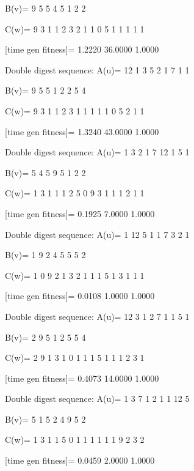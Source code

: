 B(v)=
     9     5     5     4     5     1     2     2

C(w)=
     9     3     1     1     2     3     2     1     1     0     5     1     1     1     1     1

[time gen fitness]=
    1.2220   36.0000    1.0000

Double digest sequence:
A(u)=
    12     1     3     5     2     1     7     1     1

B(v)=
     9     5     5     1     2     2     5     4

C(w)=
     9     3     1     1     2     3     1     1     1     1     1     0     5     2     1     1

[time gen fitness]=
    1.3240   43.0000    1.0000

Double digest sequence:
A(u)=
     1     3     2     1     7    12     1     5     1

B(v)=
     5     4     5     9     5     1     2     2

C(w)=
     1     3     1     1     1     2     5     0     9     3     1     1     1     2     1     1

[time gen fitness]=
    0.1925    7.0000    1.0000

Double digest sequence:
A(u)=
     1    12     5     1     1     7     3     2     1

B(v)=
     1     9     2     4     5     5     5     2

C(w)=
     1     0     9     2     1     3     2     1     1     1     5     1     3     1     1     1

[time gen fitness]=
    0.0108    1.0000    1.0000

Double digest sequence:
A(u)=
    12     3     1     2     7     1     1     5     1

B(v)=
     2     9     5     1     2     5     5     4

C(w)=
     2     9     1     3     1     0     1     1     1     5     1     1     1     2     3     1

[time gen fitness]=
    0.4073   14.0000    1.0000

Double digest sequence:
A(u)=
     1     3     7     1     2     1     1    12     5

B(v)=
     5     1     5     2     4     9     5     2

C(w)=
     1     3     1     1     5     0     1     1     1     1     1     1     9     2     3     2

[time gen fitness]=
    0.0459    2.0000    1.0000

